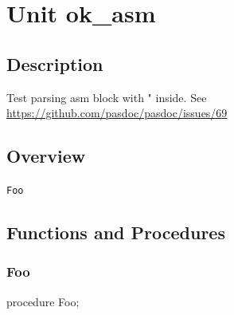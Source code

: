 \documentclass{report}
\newif\ifpdf
\begin{document}
\label{toc}\tableofcontents
\newpage
\newlength{\tmplength}
\chapter{Unit ok{\_}asm}
\label{ok_asm}
\section{Description}
Test parsing asm block with " inside. See \href{https://github.com/pasdoc/pasdoc/issues/69}{https://github.com/pasdoc/pasdoc/issues/69}
\section{Overview}
\begin{description}
\item[\texttt{Foo}]
\end{description}
\section{Functions and Procedures}
\ifpdf
\subsection*{\large{\textbf{Foo}}\normalsize\hspace{1ex}\hrulefill}
\else
\subsection*{Foo}
\fi
\label{ok_asm-Foo}
\begin{list}{}{
\setlength{\itemindent}{0cm}
\setlength{\listparindent}{0cm}
\setlength{\leftmargin}{\evensidemargin}
\addtolength{\leftmargin}{\tmplength}
\settowidth{\labelsep}{X}
\addtolength{\leftmargin}{\labelsep}
\setlength{\labelwidth}{\tmplength}
}
\item[\textbf{Declaration}\hfill]
\ifpdf
\begin{flushleft}
\fi
\begin{ttfamily}
procedure Foo;\end{ttfamily}

\ifpdf
\end{flushleft}
\fi

\end{list}
\end{document}
